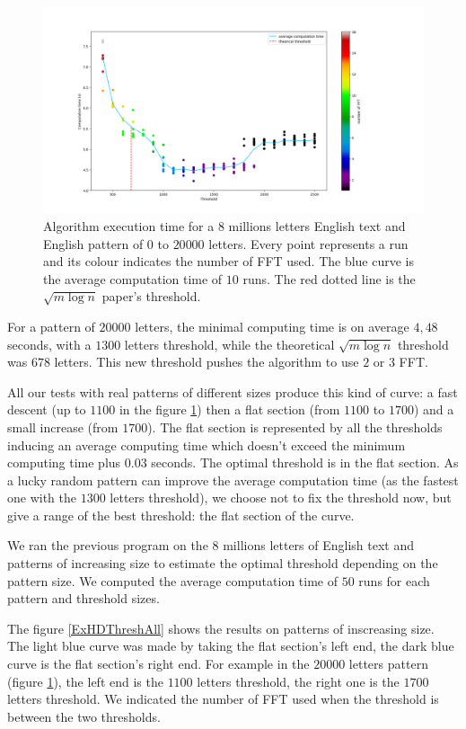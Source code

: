 \documentclass[preprint,12pt]{elsarticle}
\begin{document}
\begin{figure}[h]
\includegraphics[scale=0.45]{./figures/ExHDThreshold.png}
\caption{Algorithm execution time for a $8$ millions letters English text
and English pattern of $0$ to $20 000$ letters.
Every point represents a run and its colour indicates the number of FFT used.
The blue curve is the average computation time of $10$ runs.
The red dotted line is the $\sqrt{m \log n}$ paper's threshold.}
\label{ExHDThresh}
\end{figure}


For a pattern of $20 000$ letters, the minimal computing time is on average $4,48$ seconds,
with a $1300$ letters threshold,
while the theoretical $\sqrt{m \log n}$ threshold was $678$ letters.
This new threshold pushes the algorithm to use $2$ or $3$ FFT.

All our tests with real patterns of different sizes produce this kind of curve:
a fast descent (up to $1100$ in the figure \ref{ExHDThresh})
then a flat section (from $1100$ to $1700$) and a small increase (from $1700$).
The flat section is represented by all the thresholds inducing an average computing time
which doesn't exceed the minimum computing time plus $0.03$ seconds.
The optimal threshold is in the flat section.
As a lucky random pattern can improve the average computation time
(as the fastest one with the $1300$ letters threshold),
we choose not to fix the threshold now, but give a range of the best threshold:
the flat section of the curve.

We ran the previous program on the $8$ millions letters of English text and patterns of increasing size
to estimate the optimal threshold depending on the pattern size.
We computed the average computation time of $50$ runs for each pattern and threshold sizes.

The figure \ref{ExHDThreshAll} shows the results on patterns of inscreasing size.
The light blue curve was made by taking the flat section's left end, 
the dark blue curve is the flat section's right end.
For example in the $20 000$ letters pattern (figure \ref{ExHDThresh}),
the left end is the $1100$ letters threshold,
the right one is the $1700$ letters threshold.
We indicated the number of FFT used when the threshold is between the two thresholds.
\end{document}
